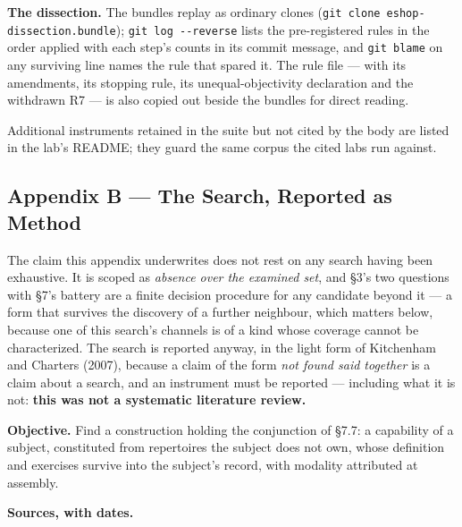 \documentclass[
]{article}
\begin{document}
\textbf{The dissection.} The bundles replay as ordinary clones
(\texttt{git\ clone\ eshop-dissection.bundle});
\texttt{git\ log\ -\/-reverse} lists the pre-registered rules in the
order applied with each step's counts in its commit message, and
\texttt{git\ blame} on any surviving line names the rule that spared it.
The rule file --- with its amendments, its stopping rule, its
unequal-objectivity declaration and the withdrawn R7 --- is also copied
out beside the bundles for direct reading.

Additional instruments retained in the suite but not cited by the body
are listed in the lab's README; they guard the same corpus the cited
labs run against.

\subsection{Appendix B --- The Search, Reported as
Method}\label{appendix-b-the-search-reported-as-method}

The claim this appendix underwrites does not rest on any search having
been exhaustive. It is scoped as \emph{absence over the examined set},
and §3's two questions with §7's battery are a finite decision procedure
for any candidate beyond it --- a form that survives the discovery of a
further neighbour, which matters below, because one of this search's
channels is of a kind whose coverage cannot be characterized. The search
is reported anyway, in the light form of Kitchenham and Charters (2007),
because a claim of the form \emph{not found said together} is a claim
about a search, and an instrument must be reported --- including what it
is not: \textbf{this was not a systematic literature review.}

\textbf{Objective.} Find a construction holding the conjunction of §7.7:
a capability of a subject, constituted from repertoires the subject does
not own, whose definition and exercises survive into the subject's
record, with modality attributed at assembly.

\textbf{Sources, with dates.}
\end{document}

